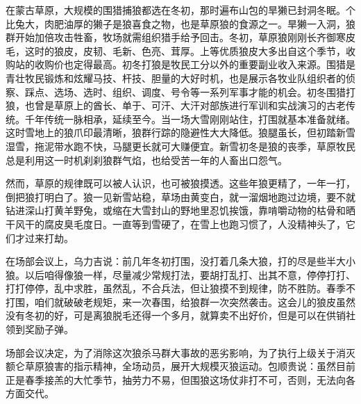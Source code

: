 \par 在蒙古草原，大规模的围猎捕狼都选在冬初，那时遍布山包的旱獭已封洞冬眠。个比兔大，肉肥油厚的獭子是狼喜食之物，也是草原狼的食源之一。旱獭一入洞，狼群开始加倍攻击牲畜，牧场就需组织猎手给予回击。冬初，草原狼刚刚长齐御寒皮毛，这时的狼皮，皮韧、毛新、色亮、茸厚。上等优质狼皮大多出自这个季节，收购站的收购价也定得最高。初冬打狼是牧民工分以外的重要副业收入来源。围猎是青壮牧民锻炼和炫耀马技、杆技、胆量的大好时机，也是展示各牧业队组织者的侦察、踩点、选场、选时、组织、调度、号令等一系列军事才能的机会。初冬围猎打狼，也曾是草原上的酋长、单于、可汗、大汗对部族进行军训和实战演习的古老传统。千年传统一脉相承，延续至今。当一场大雪刚刚站住，打围就基本准备就绪。这时雪地上的狼爪印最清晰，狼群行踪的隐避性大大降低。狼腿虽长，但初踏新雪湿雪，拖泥带水跑不快，马腿更长就可大赚便宜。新雪初冬是狼的丧季，草原牧民总是利用这一时机刹刹狼群气焰，也给受苦一年的人畜出口怨气。
\par 然而，草原的规律既可以被人认识，也可被狼摸透。这些年狼更精了，一年一打，倒把狼打明白了。狼一见新雪站稳，草场由黄变白，就一溜烟地跑过边境，要不就钻进深山打黄羊野兔，或缩在大雪封山的野地里忍饥挨饿，靠啃嚼动物的枯骨和晒干风干的腐皮臭毛度日。一直等到雪硬了，在雪上也跑习惯了，人没精神头了，它们才过来打劫。
\par 在场部会议上，乌力吉说：前几年冬初打围，没打着几条大狼，打的尽是些半大小狼。以后咱得像狼一样，尽量减少常规打法，要胡打乱打、出其不意，停停打打、打打停停，乱中求胜，虽然乱，不合兵法，但让狼摸不到规律，防不胜防。春季不打围，咱们就破破老规矩，来一次春围，给狼群一次突然袭击。这会儿的狼皮虽然没有冬初的好，可是离狼脱毛还得一个多月，就算卖不出好价，但是可以在供销社领到奖励子弹。
\par 场部会议决定，为了消除这次狼杀马群大事故的恶劣影响，为了执行上级关于消灭额仑草原狼害的指示精神，全场动员，展开大规模灭狼运动。包顺贵说：虽然目前正是春季接羔的大忙季节，抽劳力不易，但围狼这场仗非打不可，否则，无法向各方面交代。
